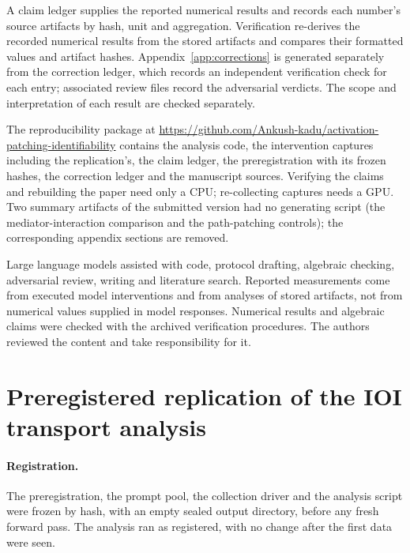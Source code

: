 A claim ledger supplies the reported numerical results and records each number's source artifacts by hash, unit
and aggregation. Verification re-derives the recorded numerical results from the stored artifacts and compares their formatted
values and artifact hashes. Appendix~\ref{app:corrections} is generated separately from the correction ledger, which records an
independent verification check for each entry; associated review files record the adversarial verdicts. The scope and
interpretation of each result are checked separately.

The reproducibility package at \url{https://github.com/Ankush-kadu/activation-patching-identifiability} contains the analysis code, the intervention captures including the replication's, the claim ledger, the preregistration with its frozen hashes, the correction ledger and the manuscript sources. Verifying the claims and
rebuilding the paper need only a CPU; re-collecting captures needs a GPU. Two summary artifacts of the submitted version had no generating script (the mediator-interaction comparison and the path-patching controls); the
corresponding appendix sections are removed.

Large language models assisted with code, protocol drafting, algebraic checking, adversarial review, writing and
literature search. Reported measurements come from executed model interventions and from analyses of stored
artifacts, not from numerical values supplied in model responses. Numerical results and algebraic claims were checked with the archived verification procedures.
The authors reviewed the content and take responsibility for it.

\section{Preregistered replication of the IOI transport analysis}
\label{app:replication}

\paragraph{Registration.} The preregistration, the prompt pool, the collection driver and the analysis script were
frozen by hash, with an empty sealed output directory, before any fresh forward pass. The analysis ran as
registered, with no change after the first data were seen.

